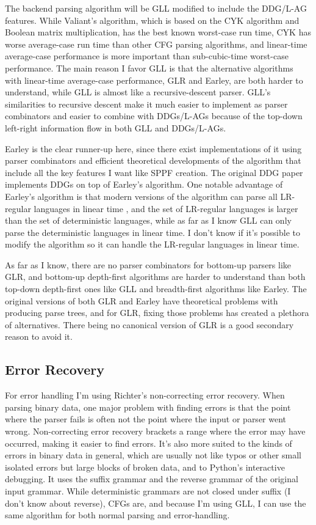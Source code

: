 \documentclass[12pt]{article}
\begin{document}
The backend parsing algorithm will be GLL modified to include the
DDG/L-AG features.  While Valiant's algorithm, which is based on the
CYK algorithm and Boolean matrix multiplication, has the best known
worst-case run time, CYK has worse average-case run time than other
CFG parsing algorithms, and linear-time average-case performance is
more important than sub-cubic-time worst-case performance.  The main
reason I favor GLL is that the alternative algorithms with linear-time
average-case performance, GLR and Earley, are both harder to
understand, while GLL is almost like a recursive-descent parser.
GLL's similarities to recursive descent make it much easier to
implement as parser combinators and easier to combine with DDGs/L-AGs
because of the top-down left-right information flow in both GLL and
DDGs/L-AGs.

Earley is the clear runner-up here, since there exist implementations
of it using parser combinators and efficient theoretical developments
of the algorithm that include all the key features I want like SPPF
creation.  The original DDG paper \textcite{yakker1} implements DDGs
on top of Earley's algorithm.  One notable advantage of Earley's
algorithm is that modern versions of the algorithm can parse all
LR-regular languages in linear time \parencite{marpa}, and the set of
LR-regular languages is larger than the set of deterministic
languages\parencite{lr-regular}, while as far as I know GLL can only
parse the deterministic languages in linear time.  I don't know if
it's possible to modify the algorithm so it can handle the LR-regular
languages in linear time.

As far as I know, there are no parser combinators for bottom-up
parsers like GLR, and bottom-up depth-first algorithms are harder to
understand than both top-down depth-first ones like GLL and
breadth-first algorithms like Earley.  The original versions of both
GLR and Earley have theoretical problems with producing parse trees,
and for GLR, fixing those problems has created a plethora of
alternatives.  There being no canonical version of GLR is a good
secondary reason to avoid it.


\subsection{Error Recovery}
\label{sec:errors}

For error handling I'm using Richter's non-correcting error recovery.
When parsing binary data, one major problem with finding errors is
that the point where the parser fails is often not the point where the
input or parser went wrong.  Non-correcting error recovery brackets a
range where the error may have occurred, making it easier to find
errors.  It's also more suited to the kinds of errors in binary data
in general, which are usually not like typos or other small isolated
errors but large blocks of broken data, and to Python's interactive
debugging.  It uses the suffix grammar and the reverse grammar of the
original input grammar.  While deterministic grammars are not closed
under suffix (I don't know about reverse), CFGs are, and because I'm
using GLL, I can use the same algorithm for both normal parsing and
error-handling.
\end{document}
